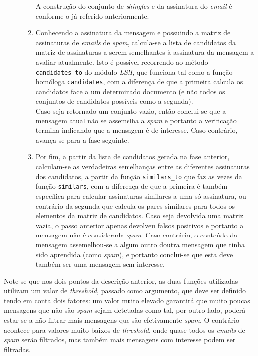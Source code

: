 \documentclass[a4paper,11pt,openright,oneside]{report}
\begin{document}
\begin{description}
\begin{enumerate}
    A construção do conjunto de \textit{shingles} e da assinatura do \textit{email} é conforme o já referido anteriormente.
  \item Conhecendo a assinatura da mensagem e possuindo a matriz de assinaturas de \textit{emails} de \textit{spam}, calcula-se a lista de candidatos da matriz de assinaturas a serem semelhantes à assinatura da mensagem a avaliar atualmente. Isto é possível recorrendo ao método \texttt{candidates\_to} do módulo \textit{LSH}, que funciona tal como a função homóloga \texttt{candidates}, com a diferença de que a primeira calcula os candidatos face a um determinado documento (e não todos os conjuntos de candidatos possíveis como a segunda). \\
    Caso seja retornado um conjunto vazio, então conclui-se que a mensagem atual não se assemelha a \textit{spam} e portanto a verificação termina indicando que a mensagem é de interesse. Caso contrário, avança-se para a fase seguinte.
  \item Por fim, a partir da lista de candidatos gerada na fase anterior, calculam-se as verdadeiras semelhanças entre as diferentes assinaturas dos candidatos, a partir da função \texttt{similars\_to} que faz as vezes da função \texttt{similars}, com a diferença de que a primeira é também específica para calcular assinaturas similares a uma só assinatura, ou contrário da segunda que calcula os pares similares para todos os elementos da matriz de candidatos. Caso seja devolvida uma matriz vazia, o passo anterior apenas devolveu falsos positivos e portanto a mensagem não é considerada \textit{spam}. Caso contrário, o conteúdo da mensagem assemelhou-se a algum outro doutra mensagem que tinha sido aprendida (como \textit{spam}), e portanto conclui-se que esta deve também ser uma mensagem sem interesse.
  \end{enumerate}
\end{description}

Note-se que nos dois pontos da descrição anterior, as duas funções utilizadas utilizam um valor de \textit{threshold}, passado como argumento, que deve ser definido tendo em conta dois fatores: um valor muito elevado garantirá que muito poucas mensagens que não são \textit{spam} sejam detetadas como tal, por outro lado, poderá estar-se a não filtrar mais mensagens que são efetivamente \textit{spam}. O contrário acontece para valores muito baixos de \textit{threshold}, onde quase todos os \textit{emails} de \textit{spam} serão filtrados, mas também mais mensagens com interesse podem ser filtradas.
\end{document}
